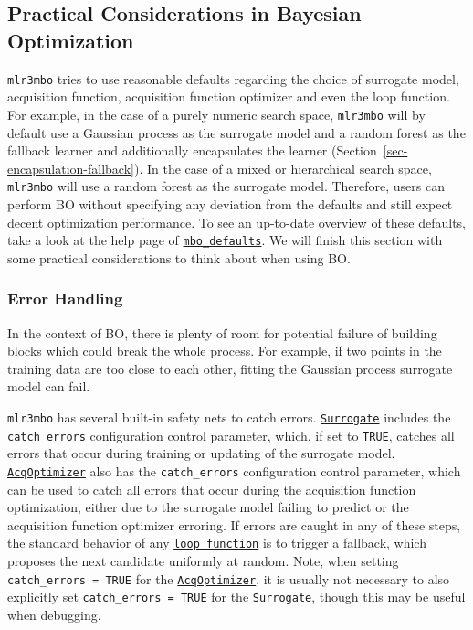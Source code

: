 \hypertarget{sec-practical-bayesian-optimization}{%
\subsection{Practical Considerations in Bayesian
Optimization}\label{sec-practical-bayesian-optimization}}

\texttt{mlr3mbo} tries to use reasonable defaults regarding the choice
of surrogate model, acquisition function, acquisition function optimizer
and even the loop function. For example, in the case of a purely numeric
search space, \texttt{mlr3mbo} will by default use a Gaussian process as
the surrogate model and a random forest as the fallback learner and
additionally encapsulates the learner
(Section~\ref{sec-encapsulation-fallback}). In the case of a mixed or
hierarchical search space, \texttt{mlr3mbo} will use a random forest as
the surrogate model. Therefore, users can perform BO without specifying
any deviation from the defaults and still expect decent optimization
performance. To see an up-to-date overview of these defaults, take a
look at the help page of
\href{https://mlr3mbo.mlr-org.com/reference/mbo_defaults.html}{\texttt{mbo\_defaults}}.
We will finish this section with some practical considerations to think
about when using BO.

\hypertarget{error-handling}{%
\subsubsection*{Error Handling}\label{error-handling}}

In the context of BO, there is plenty of room for potential failure of
building blocks which could break the whole process. For example, if two
points in the training data are too close to each other, fitting the
Gaussian process surrogate model can fail.

\texttt{mlr3mbo} has several built-in safety nets to catch errors.
\href{https://mlr3mbo.mlr-org.com/reference/Surrogate.html}{\texttt{Surrogate}}
includes the \texttt{catch\_errors} configuration control parameter,
which, if set to \texttt{TRUE}, catches all errors that occur during
training or updating of the surrogate model.
\href{https://mlr3mbo.mlr-org.com/reference/AcqOptimizer.html}{\texttt{AcqOptimizer}}
also has the \texttt{catch\_errors} configuration control parameter,
which can be used to catch all errors that occur during the acquisition
function optimization, either due to the surrogate model failing to
predict or the acquisition function optimizer erroring. If errors are
caught in any of these steps, the standard behavior of any
\href{https://mlr3mbo.mlr-org.com/reference/loop_function.html}{\texttt{loop\_function}}
is to trigger a fallback, which proposes the next candidate uniformly at
random. Note, when setting \texttt{catch\_errors\ =\ TRUE} for the
\href{https://mlr3mbo.mlr-org.com/reference/AcqOptimizer.html}{\texttt{AcqOptimizer}},
it is usually not necessary to also explicitly set
\texttt{catch\_errors\ =\ TRUE} for the \texttt{Surrogate}, though this
may be useful when debugging.

